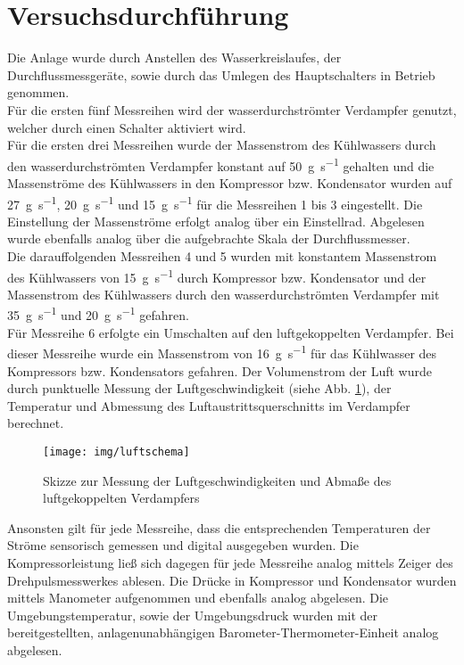\section{Versuchsdurchführung}
\label{sec:durchfuerung}
Die Anlage wurde durch Anstellen des Wasserkreislaufes, der Durchflussmessgeräte, sowie durch das Umlegen des Hauptschalters in Betrieb genommen.\\
Für die ersten fünf Messreihen wird der wasserdurchströmter Verdampfer genutzt, welcher durch einen Schalter aktiviert wird. \\
Für die ersten drei Messreihen wurde der Massenstrom des Kühlwassers durch den  wasserdurchströmten Verdampfer konstant auf \SI{50}{\gram \per \second} gehalten und die Massenströme des Kühlwassers in den Kompressor bzw. Kondensator wurden auf \SI{27}{\gram \per \second}, \SI{20}{\gram \per \second} und \SI{15}{\gram \per \second} für die Messreihen 1 bis 3 eingestellt. Die Einstellung der Massenströme erfolgt analog über ein Einstellrad. Abgelesen wurde ebenfalls analog über die aufgebrachte Skala der Durchflussmesser.\\
Die darauffolgenden Messreihen 4 und 5 wurden mit konstantem Massenstrom des Kühlwassers von \SI{15}{\gram \per \second} durch Kompressor bzw. Kondensator und der Massenstrom des Kühlwassers durch den  wasserdurchströmten Verdampfer mit \SI{35}{\gram \per \second} und \SI{20}{\gram \per \second} gefahren.\\
\newpage
Für Messreihe 6 erfolgte ein Umschalten auf den luftgekoppelten Verdampfer. Bei dieser Messreihe wurde ein Massenstrom von \SI{16}{\gram \per \second} für das Kühlwasser des Kompressors bzw. Kondensators gefahren. Der Volumenstrom der Luft wurde durch punktuelle Messung der Luftgeschwindigkeit (siehe Abb. \ref{fig:luftschema}), der Temperatur und Abmessung des Luftaustrittsquerschnitts im Verdampfer berechnet.

\begin{figure}[h!]
	\centering
	\texttt{[image: img/luftschema]}
	\caption{Skizze zur Messung der Luftgeschwindigkeiten und Abmaße des \mbox{luftgekoppelten} Verdampfers}
	\label{fig:luftschema}
\end{figure}
\FloatBarrier

Ansonsten gilt für jede Messreihe, dass die entsprechenden Temperaturen der Ströme sensorisch gemessen und digital ausgegeben wurden. Die Kompressorleistung ließ sich dagegen für jede Messreihe analog mittels Zeiger des Drehpulsmesswerkes ablesen. Die Drücke in Kompressor und Kondensator wurden mittels Manometer aufgenommen und ebenfalls analog abgelesen.
Die Umgebungstemperatur, sowie der Umgebungsdruck wurden mit der bereitgestellten, anlagenunabhängigen  Barometer-Thermometer-Einheit analog abgelesen. 
